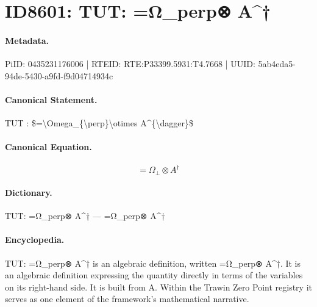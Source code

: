 \section*{ID8601: TUT: =Ω\_perp⊗ A\textasciicircum{}†}
\paragraph{Metadata.}
PiID: 0435231176006 | RTEID: RTE:P33399.5931:T4.7668 | UUID: 5ab4eda5-94de-5430-a9fd-f9d04714934c

\paragraph{Canonical Statement.}
TUT : \$=\textbackslash{}Omega\_\{\textbackslash{}perp\}\textbackslash{}otimes A\textasciicircum{}\{\textbackslash{}dagger\}\$

\paragraph{Canonical Equation.}
\[
=\Omega_{\perp}\otimes A^{\dagger}
\]

\paragraph{Dictionary.}
TUT: =Ω\_perp⊗ A\textasciicircum{}† — =Ω\_perp⊗ A\textasciicircum{}†

\paragraph{Encyclopedia.}
TUT: =Ω\_perp⊗ A\textasciicircum{}† is an algebraic definition, written =Ω\_perp⊗ A\textasciicircum{}†. It is an algebraic definition expressing the quantity directly in terms of the variables on its right-hand side. It is built from A. Within the Trawin Zero Point registry it serves as one element of the framework's mathematical narrative.
